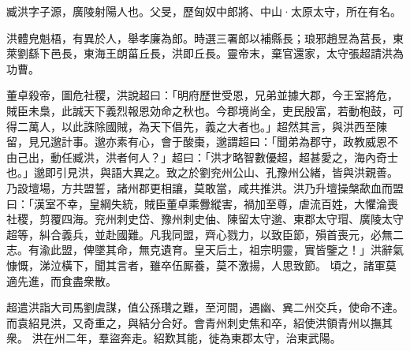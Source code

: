 \begin{pinyinscope}
 
 
 臧洪字子源，廣陵射陽人也。父旻，歷匈奴中郎將、中山·太原太守，所在有名。
 
 
 洪體皃魁梧，有異於人，舉孝廉為郎。時選三署郎以補縣長；琅邪趙昱為莒長，東萊劉繇下邑長，東海王朗菑丘長，洪即丘長。靈帝末，棄官還家，太守張超請洪為功曹。
 
 
董卓殺帝，圖危社稷，洪說超曰：「明府歷世受恩，兄弟並據大郡，今王室將危，賊臣未梟，此誠天下義烈報恩効命之秋也。今郡境尚全，吏民殷富，若動枹鼓，可得二萬人，以此誅除國賊，為天下倡先，義之大者也。」超然其言，與洪西至陳留，見兄邈計事。邈亦素有心，會于酸棗，邈謂超曰：「聞弟為郡守，政教威恩不由己出，動任臧洪，洪者何人？」超曰：「洪才略智數優超，超甚愛之，海內奇士也。」邈即引見洪，與語大異之。致之於劉兖州公山、孔豫州公緒，皆與洪親善。乃設壇場，方共盟誓，諸州郡更相讓，莫敢當，咸共推洪。洪乃升壇操槃歃血而盟曰：「漢室不幸，皇綱失統，賊臣董卓乘釁縱害，禍加至尊，虐流百姓，大懼淪喪社稷，剪覆四海。兖州刺史岱、豫州刺史伷、陳留太守邈、東郡太守瑁、廣陵太守超等，糾合義兵，並赴國難。凡我同盟，齊心戮力，以致臣節，殞首喪元，必無二志。有渝此盟，俾墜其命，無克遺育。皇天后土，祖宗明靈，實皆鑒之！」洪辭氣慷慨，涕泣橫下，聞其言者，雖卒伍厮養，莫不激揚，人思致節。
 頃之，諸軍莫適先進，而食盡衆散。
 
 
超遣洪詣大司馬劉虞謀，值公孫瓚之難，至河間，遇幽、兾二州交兵，使命不達。而袁紹見洪，又奇重之，與結分合好。會青州刺史焦和卒，紹使洪領青州以撫其衆。
 洪在州二年，羣盜奔走。紹歎其能，徙為東郡太守，治東武陽。
 

\end{pinyinscope}
